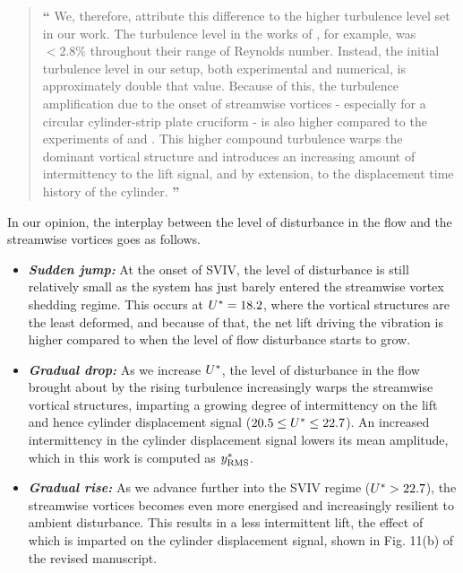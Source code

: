 \documentclass[12pt]{article}
\begin{document}
{  \begin{quotation}
    \hspace*{-1.3cm} {\Large \textbf{``}} We, therefore, attribute this difference to the higher turbulence level set in our work. The turbulence level in the works of \citet{Nguyen2012}, for example, was  $<2.8\%$ throughout their range of Reynolds number. Instead, the initial turbulence level in our setup, both experimental and numerical, is approximately double that value. Because of this, the turbulence amplification due to the onset of streamwise vortices  \citep{Zhao2018a} - especially for a circular cylinder-strip plate cruciform \citep{Koide2017} - is also higher compared to the experiments of \citet{Nguyen2012} and \citet{Koide2013}. This higher compound turbulence warps the dominant vortical structure and introduces an increasing amount of intermittency to the lift signal, and by extension, to the displacement time history of the cylinder. {\Large \textbf{''}}
   \end{quotation}

   \noindent In our opinion, the interplay between the level of disturbance in the flow and the streamwise vortices goes as follows.

   \begin{itemize}
     \item \textbf{\textit{Sudden jump:}} At the onset of SVIV, the level of disturbance is still relatively small as the system has just barely entered the streamwise vortex shedding regime. This occurs at $U^{*} = 18.2$, where the vortical structures are the least deformed, and because of that, the net lift driving the vibration is higher compared to when the level of flow disturbance starts to grow.
     \item \textbf{\textit{Gradual drop:}} As we increase $U^{*}$, the level of disturbance in the flow brought about by the rising turbulence increasingly warps the streamwise vortical structures, imparting a growing degree of intermittency on the lift and hence cylinder displacement signal ($20.5 \leq U^{*} \leq 22.7$). An increased intermittency in the cylinder displacement signal lowers its mean amplitude, which in this work is computed as $y^{*}_{\text{RMS}}$.
     \item \textbf{\textit{Gradual rise:}} As we advance further into the SVIV regime ($U^{*} > 22.7$), the streamwise vortices becomes even more energised and increasingly resilient to ambient disturbance. This results in a less intermittent lift, the effect of which is imparted on the cylinder displacement signal, shown in Fig. 11(b) of the revised manuscript.
   \end{itemize}

}
\end{document}
